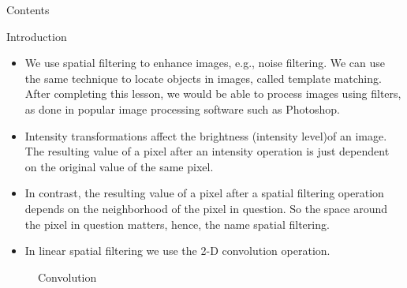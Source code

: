 \begin{frame}{Contents}
\tableofcontents
\end{frame}

\begin{frame}{Introduction}
    \begin{itemize}
      \item We use spatial filtering to enhance images, e.g., noise filtering. We can use the same technique to locate objects in images, called template matching. After completing this lesson, we would be able to process images using filters, as done in popular image processing software such as Photoshop.
      \item Intensity transformations affect the brightness (intensity level)of an image. The resulting value of a pixel after an intensity operation is just dependent on the original value of the same pixel.
      \item In contrast, the resulting value of a pixel after a spatial filtering operation depends on the neighborhood of the pixel in question. So the space around the pixel in question matters, hence, the name spatial filtering.
      \item In linear spatial filtering we use the 2-D convolution operation.
    \end{itemize}
\end{frame}

\begin{frame}
        \begin{figure}
          \centering
            
          \caption{Convolution}
        \end{figure}
\end{frame}



